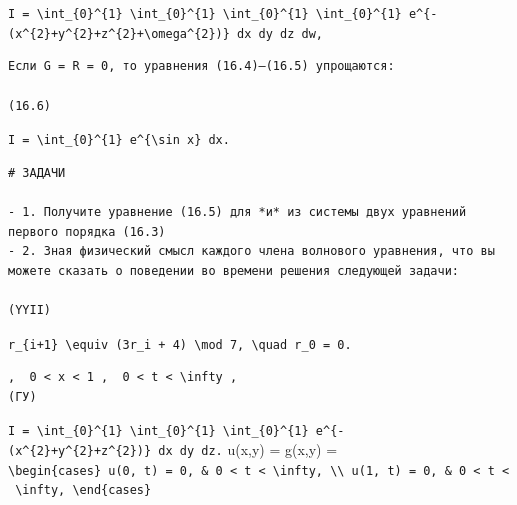 \documentclass[
  ukrainian,
]{article}
\begin{document}
\texttt{I\ =\ \textbackslash{}int\_\{0\}\^{}\{1\}\ \textbackslash{}int\_\{0\}\^{}\{1\}\ \textbackslash{}int\_\{0\}\^{}\{1\}\ \textbackslash{}int\_\{0\}\^{}\{1\}\ e\^{}\{-(x\^{}\{2\}+y\^{}\{2\}+z\^{}\{2\}+\textbackslash{}omega\^{}\{2\})\}\ dx\ dy\ dz\ dw,}

\begin{verbatim}
Если G = R = 0, то уравнения (16.4)—(16.5) упрощаются:

(16.6)
\end{verbatim}

\texttt{I\ =\ \textbackslash{}int\_\{0\}\^{}\{1\}\ e\^{}\{\textbackslash{}sin\ x\}\ dx.}

\begin{verbatim}
# ЗАДАЧИ

- 1. Получите уравнение (16.5) для *и* из системы двух уравнений первого порядка (16.3)
- 2. Зная физический смысл каждого члена волнового уравнения, что вы можете сказать о поведении во времени решения следующей задачи:

(YYII)
\end{verbatim}

\texttt{r\_\{i+1\}\ \textbackslash{}equiv\ (3r\_i\ +\ 4)\ \textbackslash{}mod\ 7,\ \textbackslash{}quad\ r\_0\ =\ 0.}

\begin{verbatim}
,  0 < x < 1 ,  0 < t < \infty ,  
(ГУ)
\end{verbatim}

\texttt{I\ =\ \textbackslash{}int\_\{0\}\^{}\{1\}\ \textbackslash{}int\_\{0\}\^{}\{1\}\ \textbackslash{}int\_\{0\}\^{}\{1\}\ e\^{}\{-(x\^{}\{2\}+y\^{}\{2\}+z\^{}\{2\})\}\ dx\ dy\ dz.}
u(x,y) = g(x,y) =
\texttt{\textbackslash{}begin\{cases\}\ u(0,\ t)\ =\ 0,\ \&\ 0\ \textless{}\ t\ \textless{}\ \textbackslash{}infty,\ \textbackslash{}\textbackslash{}\ u(1,\ t)\ =\ 0,\ \&\ 0\ \textless{}\ t\ \textless{}\ \textbackslash{}infty,\ \textbackslash{}end\{cases\}}
\end{document}

